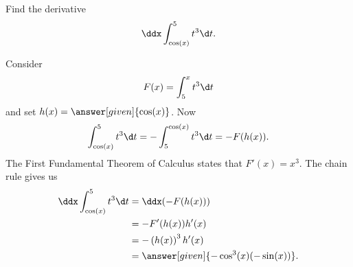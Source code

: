 \documentclass{ximera}
\begin{document}
\begin{example}
  Find the
  derivative 
  \[
 \ddx\int_{\cos(x)}^5 t^3\d t.
  \]
  \begin{explanation}
    Consider
    \[
    F(x) = \int_5^x t^3 \d t
    \]
    and set $h(x) = \answer[given]{\cos(x)}$. Now
    \[
  \int_{\cos(x)}^5 t^3\d t =- \int_{5}^{\cos(x)} t^3\d t = -F(h(x)).
    \]
    The First Fundamental Theorem of Calculus states that $F'(x) = x^3$. The chain rule gives us
    \begin{align*}
      \ddx\int_{\cos(x)}^5 t^3\d t &=  \ddx (-F(h(x)))\\
     &= -F'(h(x))h'(x)\\
      &=-\left(h(x)\right)^3 h'(x)\\
      &=\answer[given]{-\cos^3(x) (-\sin(x))}.
    \end{align*}
  \end{explanation}
\end{example}
\end{document}
